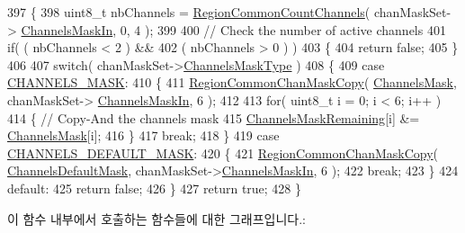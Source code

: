 \begin{DoxyCode}
397 \{
398     uint8\_t nbChannels = \mbox{\hyperlink{group___r_e_g_i_o_n_c_o_m_m_o_n_gac23f0831812f610f57f42f6cf87368c9}{RegionCommonCountChannels}}( chanMaskSet->
      \mbox{\hyperlink{structs_chan_mask_set_params_ade387d6ecaf27781b14ad97ebdfc0695}{ChannelsMaskIn}}, 0, 4 );
399 
400     \textcolor{comment}{// Check the number of active channels}
401     \textcolor{keywordflow}{if}( ( nbChannels < 2 ) &&
402         ( nbChannels > 0 ) )
403     \{
404         \textcolor{keywordflow}{return} \textcolor{keyword}{false};
405     \}
406 
407     \textcolor{keywordflow}{switch}( chanMaskSet->\mbox{\hyperlink{structs_chan_mask_set_params_a02b75be74cbc34fa2126b2c250ea9283}{ChannelsMaskType}} )
408     \{
409         \textcolor{keywordflow}{case} \mbox{\hyperlink{group___r_e_g_i_o_n_gga7a62e669f567fc160ad58210664bca9ca1e68275c0b16a0c4935eada4315dd089}{CHANNELS\_MASK}}:
410         \{
411             \mbox{\hyperlink{group___r_e_g_i_o_n_c_o_m_m_o_n_ga95f5199d490113269fae7f2e0569e9a0}{RegionCommonChanMaskCopy}}( \mbox{\hyperlink{_region_u_s915_8c_a2188957b5ca6af8092154d7ccbfa5757}{ChannelsMask}}, chanMaskSet->
      \mbox{\hyperlink{structs_chan_mask_set_params_ade387d6ecaf27781b14ad97ebdfc0695}{ChannelsMaskIn}}, 6 );
412 
413             \textcolor{keywordflow}{for}( uint8\_t i = 0; i < 6; i++ )
414             \{ \textcolor{comment}{// Copy-And the channels mask}
415                 \mbox{\hyperlink{_region_u_s915_8c_a567333cec639a004655cc1717e9d0928}{ChannelsMaskRemaining}}[i] &= \mbox{\hyperlink{_region_u_s915_8c_a2188957b5ca6af8092154d7ccbfa5757}{ChannelsMask}}[i];
416             \}
417             \textcolor{keywordflow}{break};
418         \}
419         \textcolor{keywordflow}{case} \mbox{\hyperlink{group___r_e_g_i_o_n_gga7a62e669f567fc160ad58210664bca9ca9bbb18c8600ad8781ba04a2cb121ea60}{CHANNELS\_DEFAULT\_MASK}}:
420         \{
421             \mbox{\hyperlink{group___r_e_g_i_o_n_c_o_m_m_o_n_ga95f5199d490113269fae7f2e0569e9a0}{RegionCommonChanMaskCopy}}( 
      \mbox{\hyperlink{_region_u_s915_8c_ac127b19779301713d5ed92eb03366a2d}{ChannelsDefaultMask}}, chanMaskSet->\mbox{\hyperlink{structs_chan_mask_set_params_ade387d6ecaf27781b14ad97ebdfc0695}{ChannelsMaskIn}}, 6 );
422             \textcolor{keywordflow}{break};
423         \}
424         \textcolor{keywordflow}{default}:
425             \textcolor{keywordflow}{return} \textcolor{keyword}{false};
426     \}
427     \textcolor{keywordflow}{return} \textcolor{keyword}{true};
428 \}
\end{DoxyCode}
이 함수 내부에서 호출하는 함수들에 대한 그래프입니다.\+:
\mbox{\label{group___r_e_g_i_o_n_u_s915_gad085905909fed76b2b7355aa2e22e1f7}} 
